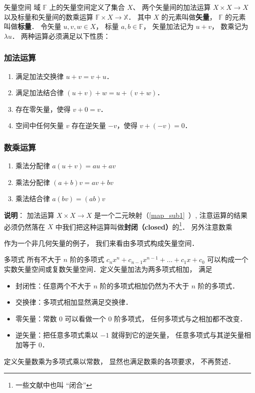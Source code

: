 \begin{definition}{矢量空间}
域 $\mathbb F$ 上的矢量空间定义了集合 $X$、 两个矢量间的加法运算 $X\times X \to X$ 以及标量和矢量间的数乘运算 $\mathbb F \times X \to \mathbb X$． 其中 $X$ 的元素叫做\textbf{矢量}， $\mathbb F$ 的元素叫做\textbf{标量}． 令矢量 $u,v,w \in X$， 标量 $a,b \in \mathbb F$， 矢量加法记为 $u + v$， 数乘记为 $\lambda u$． 两种运算必须满足以下性质：

\subsubsection{加法运算}
\begin{enumerate}
\item 满足加法交换律 $u + v = v + u$．
\item 满足加法结合律 $(u + v) + w = u + (v + w)$．
\item 存在零矢量，使得 $v + 0 = v$．
\item 空间中任何矢量 $v$ 存在逆矢量 $-v$，使得 $v + (-v) = 0$．
\end{enumerate}

\subsubsection{数乘运算}
\begin{enumerate}
\item 乘法分配律 $a(u + v) = au + av$ 
\item 乘法分配律 $(a + b)v = av + bv$
\item 乘法结合律 $a (b v) = (ab) v$
\end{enumerate}
\end{definition}

\textbf{说明}： 加法运算 $X \times X \to X$ 是一个二元映射（\autoref{map_sub1}~）, 注意运算的结果必须仍然落在 $X$ 中我们把这种运算叫做\textbf{封闭（closed）}的\footnote{一些文献中也叫 “闭合”}． 另外注意数乘


作为一个非几何矢量的例子， 我们来看由多项式构成矢量空间．

\begin{example}{多项式}\label{LSpace_ex1}
所有不大于 $n$ 阶的多项式 $c_n x^n + c_{n-1} x^{n-1} + \dots + c_1 x + c_0$ 可以构成一个实数矢量空间或复数矢量空间．定义矢量加法为两多项式相加， 满足
\begin{itemize}
\item 封闭性：任意两个不大于 $n$ 阶的多项式相加仍然为不大于 $n$ 阶的多项式．
\item 交换律：多项式相加显然满足交换律．
\item 零矢量：常数 0 可以看做一个 0 阶多项式， 任何多项式与之相加都不改变．
\item 逆矢量：把任意多项式乘以 $-1$ 就得到它的逆矢量， 任意多项式与其逆矢量相加等于 0．
\end{itemize}
定义矢量数乘为多项式乘以常数， 显然也满足数乘的各项要求， 不再赘述．
\end{example}

